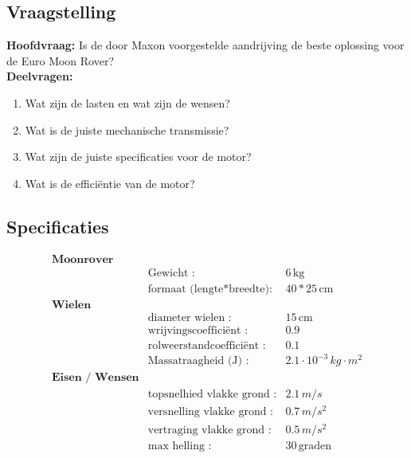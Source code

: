 \subsection{Vraagstelling}
\textbf{Hoofdvraag:}
Is de door Maxon voorgestelde aandrijving de beste oplossing voor de Euro Moon Rover?\\
\textbf{Deelvragen:}
\begin{enumerate}
    \item Wat zijn de lasten en wat zijn de wensen?
    \item Wat is de juiste mechanische transmissie?
    \item Wat zijn de juiste specificaties voor de motor?
    \item Wat is de efficiëntie van de motor?
\end{enumerate}

\subsection{Specificaties}
\begin{align*}
  \textbf{Moonrover}\\
  &\text{Gewicht :} & 6 \, \text{kg} \\
  &\text{formaat (lengte*breedte):} & 40*25 \, \text{cm}\\
  \textbf{Wielen}\\
  &\text{diameter wielen :} & 15 \, \text{cm}\\
  &\text{wrijvingscoefficiënt :} & 0.9 \, \\
  &\text{rolweerstandcoefficiënt :} & 0.1 \, \\
  &\text{Massatraagheid (J) :} & \text{$2.1 \cdot 10^{-3}$} \, \text{$kg \cdot m^{2}$}\\
  \textbf{Eisen / Wensen}\\
  &\text{topsnelhied vlakke grond :} & 2.1 \, \text{$m/s$}\\
  &\text{versnelling vlakke grond :} & 0.7 \, \text{$m/s^{2}$}\\
  &\text{vertraging vlakke grond :} & 0.5 \, \text{$m/s^{2}$}\\
  &\text{max helling :} & 30 \, \text{graden}
\end{align*}
\cite{canvas}